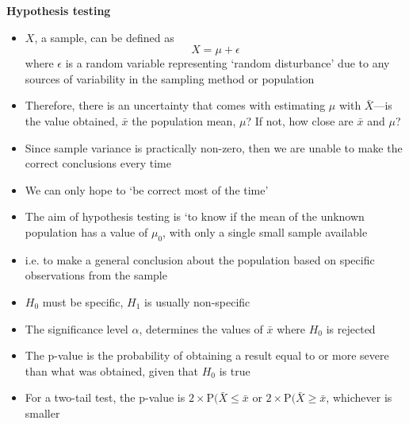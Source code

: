 \documentclass[a4paper]{article}
\newcommand{\heading}[1]{{\small\textbf{#1}}}
\begin{document}
\begin{multicols*}{4}
\heading{Hypothesis testing}
\begin{itemize} \itemsep -0.5em
    \item $X$, a sample, can be defined as $$X=\mu+\epsilon$$ 
        where $\epsilon$ is a random variable representing `random
        disturbance' due to any sources of variability in the sampling
        method or population
    \item Therefore, there is an uncertainty that comes with estimating
        $\mu$ with $\bar{X}$---is the value obtained, $\bar{x}$ the
        population mean, $\mu$? If not, how close are $\bar{x}$ and
        $\mu$?
    \item Since sample variance is practically non-zero, then we are
        unable to make the correct conclusions every time
    \item We can only hope to `be correct most of the time'
    \item The aim of hypothesis testing is `to know if the mean of the
        unknown population has a value of $\mu_0$, with only a single
        small sample available
    \item i.e. to make a general conclusion about the population based
        on specific observations from the sample
    \item $H_0$ must be specific, $H_1$ is usually non-specific
    \item The significance level $\alpha$, determines the values of
        $\bar{x}$ where $H_0$ is rejected
    \item The p-value is the probability of obtaining a result equal to
        or more severe than what was obtained, given that $H_0$ is true
    \item For a two-tail test, the p-value is $2 \times
        \mathrm{P}(\bar{X} \leq \bar{x}$ or $2 \times \mathrm{P}(\bar{X}
        \geq \bar{x}$, whichever is smaller
\end{itemize}


\end{multicols*}
\end{document}
